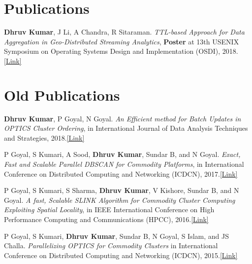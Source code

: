 \documentclass[margin,line]{res}
\begin{document}
\begin{resume}
\section{\sc Publications}
\textbf{Dhruv Kumar}, J Li, A Chandra, R Sitaraman. {\it TTL-based Approach for Data Aggregation in Geo-Distributed Streaming Analytics}, \textbf{Poster} at 13th USENIX Symposium on Operating Systems Design and Implementation (OSDI), 2018.\href{https://drive.google.com/open?id=1NvtkQn05QvFCNMhVhlG9BBjGk5RvOAot}{\color{blue}[Link]}

\section{ \sc Old    \space Publications\protect\footnotemark{}}
\protect{}

{\bf Dhruv Kumar}, P Goyal, N Goyal. {\it An Efficient method for Batch Updates in OPTICS Cluster Ordering}, in International Journal of Data Analysis Techniques and
Strategies, 2018.\href{https://www.inderscienceonline.com/doi/pdf/10.1504/IJDATS.2018.090631}{\color{blue}[Link]}

P Goyal, S Kumari, A Sood, {\bf  Dhruv Kumar}, Sundar B, and N Goyal. {\it Exact, Fast and Scalable Parallel DBSCAN for Commodity Platforms}, in International Conference on Distributed Computing and Networking
(ICDCN), 2017.\href{https://dl.acm.org/citation.cfm?id=3007773}{\color{blue}[Link]}

P Goyal, S Kumari, S Sharma, {\bf Dhruv Kumar}, V Kishore, Sundar
B, and N Goyal. {\it A fast, Scalable SLINK Algorithm for Commodity
	Cluster Computing Exploiting Spatial Locality}, in IEEE International Conference on High Performance Computing and Communications (HPCC), 2016.\href{http://ieeexplore.ieee.org/document/7828388/}{\color{blue}[Link]}

P Goyal, S Kumari, {\bf Dhruv Kumar}, Sundar B, N Goyal, S Islam, and JS Challa. {\it Parallelizing OPTICS for Commodity Clusters} in International Conference on Distributed Computing and Networking (ICDCN), 2015.\href{http://dl.acm.org/citation.cfm?id=2684477}{\color{blue}[Link]}


\end{resume}
\end{document}
